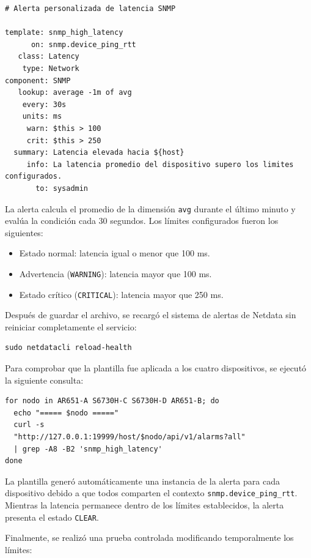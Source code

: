\begin{lstlisting}[style=terminal]
# Alerta personalizada de latencia SNMP

template: snmp_high_latency
      on: snmp.device_ping_rtt
   class: Latency
    type: Network
component: SNMP
   lookup: average -1m of avg
    every: 30s
    units: ms
     warn: $this > 100
     crit: $this > 250
  summary: Latencia elevada hacia ${host}
     info: La latencia promedio del dispositivo supero los limites configurados.
       to: sysadmin
\end{lstlisting}

La alerta calcula el promedio de la dimensión \texttt{avg} durante el último minuto y evalúa la condición cada 30 segundos. Los límites configurados fueron los siguientes:

\begin{itemize}
    \item Estado normal: latencia igual o menor que 100 ms.
    \item Advertencia (\texttt{WARNING}): latencia mayor que 100 ms.
    \item Estado crítico (\texttt{CRITICAL}): latencia mayor que 250 ms.
\end{itemize}

Después de guardar el archivo, se recargó el sistema de alertas de Netdata sin reiniciar completamente el servicio:

\begin{lstlisting}[style=terminal]
sudo netdatacli reload-health
\end{lstlisting}

Para comprobar que la plantilla fue aplicada a los cuatro dispositivos, se ejecutó la siguiente consulta:

\begin{lstlisting}[style=terminal]
for nodo in AR651-A S6730H-C S6730H-D AR651-B; do
  echo "===== $nodo ====="
  curl -s 
  "http://127.0.0.1:19999/host/$nodo/api/v1/alarms?all" 
  | grep -A8 -B2 'snmp_high_latency'
done
\end{lstlisting}

La plantilla generó automáticamente una instancia de la alerta para cada dispositivo debido a que todos comparten el contexto \texttt{snmp.device\_ping\_rtt}. Mientras la latencia permanece dentro de los límites establecidos, la alerta presenta el estado \texttt{CLEAR}. \cite{netdata2}

Finalmente, se realizó una prueba controlada modificando temporalmente los límites:

